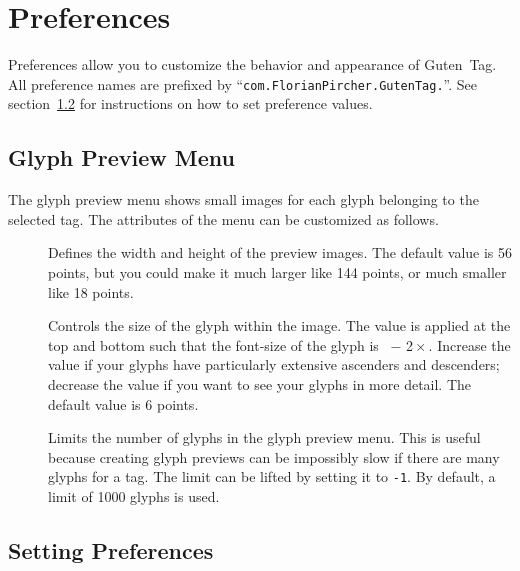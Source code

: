 \chapter{Preferences}%
\label{cha:preferences}

Preferences allow you to customize the behavior and appearance of Guten~Tag.
All preference names are prefixed by \enquote{\texttt{com.FlorianPircher.GutenTag.}}.
See section~\ref{sec:setting_preferences} for instructions on how to set preference values.

\section{Glyph Preview Menu}%
\label{sec:glyph_preview_menu}

\noindent{}
\medskip

\noindent The glyph preview menu shows small images for each glyph belonging to the selected tag.
The attributes of the menu can be customized as follows.

\begin{description}
  \item[]
    Defines the width and height of the preview images.
    The default value is 56 points, but you could make it much larger like 144 points, or much smaller like 18 points.
  
  \item[]
    Controls the size of the glyph within the image.
    The value is applied at the top and bottom such that the font-size of the glyph is ~− {2}\,×\,.
    Increase the value if your glyphs have particularly extensive ascenders and descenders;
    decrease the value if you want to see your glyphs in more detail.
    The default value is 6 points.
  
  \item[]
    Limits the number of glyphs in the glyph preview menu.
    This is useful because creating glyph previews can be impossibly slow if there are many glyphs for a tag.
    The limit can be lifted by setting it to \texttt{-1}.
    By default, a limit of 1000 glyphs is used.
\end{description}

\section{Setting Preferences}%
\label{sec:setting_preferences}

